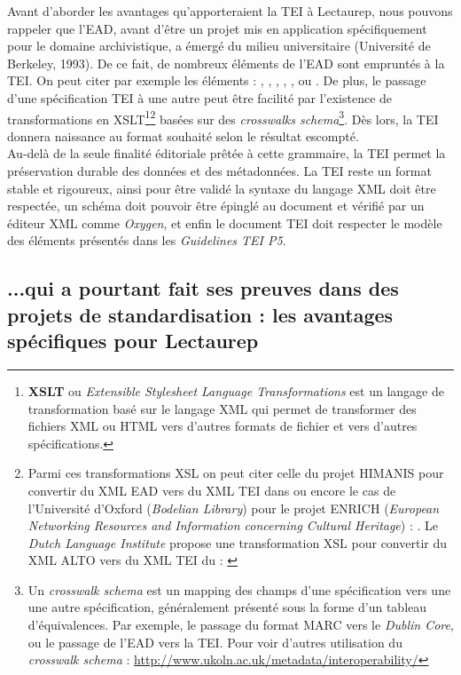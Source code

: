 \bigskip
Avant d'aborder les avantages qu'apporteraient la TEI à Lectaurep, nous pouvons rappeler que l'EAD, avant d'être un projet mis en application spécifiquement pour le domaine archivistique, a émergé du milieu universitaire (Université de Berkeley, 1993). De ce fait, de nombreux éléments de l'EAD sont empruntés à la TEI. On peut citer par exemple les éléments  : , , , , , ou .
De plus, le passage d'une spécification TEI à une autre peut être facilité par l'existence de transformations en XSLT\footnote{\textbf{XSLT} ou \textit{Extensible Stylesheet Language Transformations} est un langage de transformation basé sur le langage XML qui permet de transformer des fichiers XML ou HTML vers d'autres formats de fichier et vers d'autres spécifications.}\footnote{Parmi ces transformations XSL on peut citer celle du projet HIMANIS pour convertir du XML EAD vers du XML TEI dans \cite{stutzmann_ead-tei_2019} ou encore le cas de l'Université d'Oxford (\textit{Bodelian Library}) pour le projet ENRICH (\textit{European Networking Resources and Information concerning Cultural Heritage}) : \cite{noauthor_ead2enrich_nodate}. Le \textit{Dutch Language Institute} propose une transformation XSL pour convertir du XML ALTO vers du XML TEI du : \cite{noauthor_alto2tei_nodate}} basées sur des \textit{crosswalks schema}\footnote{Un \textit{crosswalk schema} est un mapping des champs d'une spécification vers une une autre spécification, généralement présenté sous la forme d'un tableau d'équivalences. Par exemple, le passage du format MARC vers le \textit{Dublin Core}, ou le passage de l'EAD vers la TEI. Pour voir d'autres utilisation du \textit{crosswalk schema} : \url{http://www.ukoln.ac.uk/metadata/interoperability/}}. Dès lors, la TEI donnera naissance au format souhaité selon le résultat escompté.\\

Au-delà de la seule finalité éditoriale prêtée à cette grammaire, la TEI permet la préservation durable des données et des métadonnées. La TEI reste un format stable et rigoureux, ainsi pour être validé la syntaxe du langage XML doit être respectée, un schéma doit pouvoir être épinglé au document et vérifié par un éditeur XML comme \textit{Oxygen}, et enfin le document TEI doit respecter le modèle des éléments présentés dans les \textit{Guidelines TEI P5}.
\newpage
\subsection{...qui a pourtant fait ses preuves dans des projets de standardisation : les avantages spécifiques pour Lectaurep}\label{positif_TEI}

